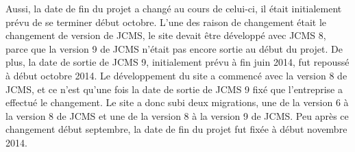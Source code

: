 \documentclass[12pt,a4paper]{article}
\begin{document}
\medskip
Aussi, la date de fin du projet a changé au cours de celui-ci, il était initialement prévu de se terminer début octobre. L'une des raison de changement était le changement de version de \gls{JCMS}, le site devait être développé avec \gls{JCMS} 8, parce que la version 9 de \gls{JCMS} n'était pas encore sortie au début du projet. De plus, la date de sortie de \gls{JCMS} 9, initialement prévu à fin juin 2014, fut repoussé à début octobre 2014. Le développement du site a commencé avec la version 8 de \gls{JCMS}, et ce n'est qu'une fois la date de sortie de \gls{JCMS} 9 fixé que l'entreprise a effectué le changement. Le site a donc subi deux migrations, une de la version 6 à la version 8 de \gls{JCMS} et une de la version 8 à la version 9 de \gls{JCMS}. Peu après ce changement début septembre, la date de fin du projet fut fixée à début novembre 2014.\par

\begin{sideways}
\begin{ganttchart}{1}{32}
\\
 \\
 \\
\\
\\
\\
\\
\\
\\
\\
\\
\\
\\
\\
\end{ganttchart}
\end{sideways}
\end{document}
